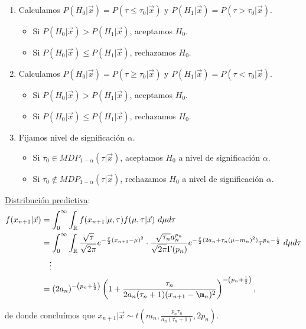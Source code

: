 \begin{enumerate}
    \item Calculamos $P(H_0 | \vec{x}) = P(\tau\leq \tau_0 |\vec{x})$ y $P(H_1 | \vec{x}) = P(\tau> \tau_0 | \vec{x})$.
    \begin{itemize}
        \item Si $P(H_0 | \vec{x}) > P(H_1 | \vec{x})$, aceptamos $H_0$.
        \item Si $P(H_0 | \vec{x}) \leq P(H_1 | \vec{x})$, rechazamos $H_0$.
    \end{itemize}
        \item Calculamos $P(H_0 | \vec{x}) = P(\tau \ge \tau_0 |\vec{x})$ y $P(H_1 | \vec{x}) = P(\tau< \tau_0 | \vec{x})$.
    \begin{itemize}
        \item Si $P(H_0 | \vec{x}) > P(H_1 | \vec{x})$, aceptamos $H_0$.
        \item Si $P(H_0 | \vec{x}) \leq P(H_1 | \vec{x})$, rechazamos $H_0$.
    \end{itemize}
    \item Fijamos nivel de significación $\alpha$.
    \begin{itemize}
        \item Si $\tau_0 \in MDP_{1 - \alpha}(\tau | \vec{x})$, aceptamos $H_0$ a nivel de significación $\alpha$.
        \item Si $\tau_0 \not\in MDP_{1 - \alpha}(\tau| \vec{x})$, rechazamos $H_0$ a nivel de significación $\alpha$.
    \end{itemize}
\end{enumerate}
\noindent \underline{Distribución predictiva}:
\begin{align*}
    f(x_{n+1} | \vec{x}) &= \int_{0}^{\infty} \int_{\mathbb{R}} f(x_{n+1} | \mu, \tau) f(\mu,\tau | \vec{x}) \ d\mu d\tau \\
    &= \int_{0}^{\infty} \int_{\mathbb{R}} \frac{\sqrt{\tau}}{\sqrt{2\pi}}e^{-\frac{\tau}{2}(x_{n+1} -\mu)^2} \cdot \frac{\sqrt{\tau_n}a_n^{p_n}}{\sqrt{2\pi}\Gamma(p_n)}e^{-\frac{\tau}{2}(2a_n + \tau_n(\mu-m_n)^2)} \tau^{p_n - \frac{1}{2}} \ d\mu d\tau \\
    & \quad \vdots \\
    &= (2a_n)^{-\left(p_n + \frac{1}{2} \right)}\left( 1 + \frac{\tau_n}{2a_n(\tau_n+1)(x_{n+1} - \m_n)^2}\right)^{-\left(p_n + \frac{1}{2} \right)},
\end{align*}

\noindent de donde concluímos que $x_{n+1} | \vec{x} \sim t\left(m_n, \frac{p_n\tau_n}{a_n(\tau_n+1)}, 2p_n \right)$.

